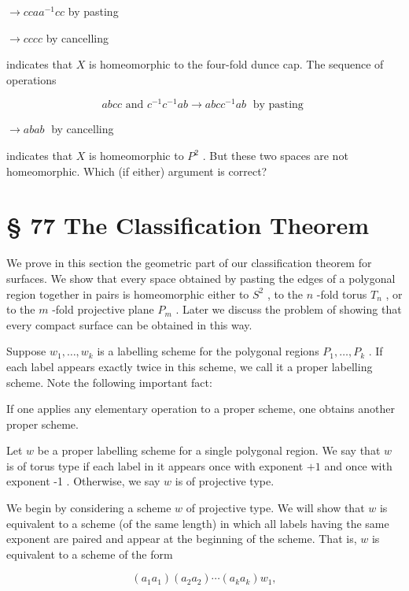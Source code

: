 \begin{theorem}
\(\rightarrow  c{caa}^{-1}{cc}\) by pasting

\(\rightarrow  {cccc}\) by cancelling

indicates that \(X\) is homeomorphic to the four-fold dunce cap. The sequence of operations

\[
{abcc}\text{ and }{c}^{-1}{c}^{-1}{ab} \rightarrow  {abc}{c}^{-1}{ab}\;\text{ by pasting }
\]

\(\rightarrow  {abab}\;\) by cancelling

indicates that \(X\) is homeomorphic to \({P}^{2}\) . But these two spaces are not homeomorphic. Which (if either) argument is correct?

\section*{§ 77 The Classification Theorem}

We prove in this section the geometric part of our classification theorem for surfaces. We show that every space obtained by pasting the edges of a polygonal region together in pairs is homeomorphic either to \({S}^{2}\) , to the \(n\) -fold torus \({T}_{n}\) , or to the \(m\) -fold projective plane \({P}_{m}\) . Later we discuss the problem of showing that every compact surface can be obtained in this way.

Suppose \({w}_{1},\ldots ,{w}_{k}\) is a labelling scheme for the polygonal regions \({P}_{1},\ldots ,{P}_{k}\) . If each label appears exactly twice in this scheme, we call it a proper labelling scheme. Note the following important fact:

If one applies any elementary operation to a proper scheme, one obtains another proper scheme.

\begin{definition} Let \(w\) be a proper labelling scheme for a single polygonal region. We say that \(w\) is of torus type if each label in it appears once with exponent \(+ 1\) and once with exponent -1 . Otherwise, we say \(w\) is of projective type.
\end{definition}

We begin by considering a scheme \(w\) of projective type. We will show that \(w\) is equivalent to a scheme (of the same length) in which all labels having the same exponent are paired and appear at the beginning of the scheme. That is, \(w\) is equivalent to a scheme of the form

\[
\left( {{a}_{1}{a}_{1}}\right) \left( {{a}_{2}{a}_{2}}\right) \cdots \left( {{a}_{k}{a}_{k}}\right) {w}_{1},
\]


\end{theorem}

